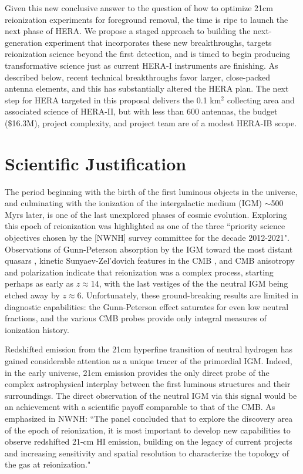 \documentclass[preprint]{aastex}
\begin{document}
Given this new conclusive answer to the question of how to optimize 21cm reionization
experiments for foreground removal,
the time is ripe to launch the next phase of HERA.  We propose a
staged approach to building the next-generation experiment that incorporates these
new breakthroughs, targets reionization science beyond the first detection, and
is timed to begin producing transformative science just as current HERA-I instruments
are finishing.  As described below, recent technical breakthroughs favor
larger, close-packed antenna elements, and this has substantially altered the
HERA plan.  The next step for HERA targeted in this proposal delivers the 0.1
km$^2$ collecting area and associated science of HERA-II, but with less than
600 antennas, the budget (\$16.3M), project complexity, and project team are of
a modest HERA-IB scope.

\vspace{-0.25in}
\section{Scientific Justification}

The period beginning with the birth of the first luminous objects in the
universe, and culminating with the ionization of the intergalactic medium (IGM)
$\sim$500 Myrs later, is one of the last unexplored phases of cosmic evolution.
Exploring this epoch of reionization was highlighted as one of the three
``priority science objectives chosen by the [NWNH] survey committee for the
decade 2012-2021". Observations of Gunn-Peterson absorption
by the IGM toward the most distant quasars \citep{fan_et_al2006}, kinetic
Sunyaev-Zel'dovich features in the CMB \citep{zahn_et_al2012}, and CMB
anisotropy and polarization \citep{page_et_al2007,planck_et_al2013} indicate
that reionization was a complex process, starting perhaps as early as 
$z\approx14$, with the last vestiges of the the neutral IGM being etched away by
$z\approx6$.  Unfortunately, these ground-breaking results are limited in
diagnostic capabilities: the Gunn-Peterson effect saturates for even low
neutral fractions, and the various CMB probes provide only integral measures of 
ionization history.

Redshifted emission from the 21cm hyperfine transition of neutral hydrogen has
gained considerable attention as a unique tracer of the
primordial IGM.  Indeed, in the early universe, 21cm emission provides the
only direct probe of the complex astrophysical interplay between the first luminous
structures and their surroundings.  The direct observation of the neutral IGM via this signal
would be an achievement with a scientific payoff comparable to that of the CMB.  As
emphasized in NWNH: ``The panel concluded that to explore the
discovery area of the epoch of reionization, it is most important to develop
new capabilities to observe redshifted 21-cm HI emission, building on the
legacy of current projects and increasing sensitivity and spatial resolution to
characterize the topology of the gas at reionization."  
\end{document}
